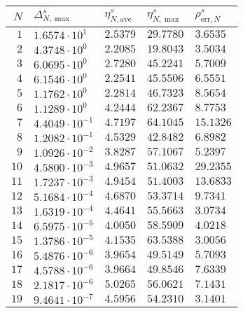 \begin{table}[h!]
    \begin{center}
        \small
        \begin{tabular}{r|llll}
        $N$ & $\Delta^s_{N,\max}$ & $\eta^s_{N,\text{ave}}$ & $\eta^s_{N,\max}$ & $\rho^s_{\text{err}, N}$ \\
        \hline
            $1$ & $1.6574 \cdot 10^{1}$ & $2.5379$ & $29.7780$ & $3.6535$ \\
            $2$ & $4.3748 \cdot 10^{0}$ & $2.2085$ & $19.8043$ & $3.5034$ \\
            $3$ & $6.0695 \cdot 10^{0}$ & $2.7280$ & $45.2241$ & $5.7009$ \\
            $4$ & $6.1546 \cdot 10^{0}$ & $2.2541$ & $45.5506$ & $6.5551$ \\
            $5$ & $1.1762 \cdot 10^{0}$ & $2.2814$ & $46.7323$ & $8.5654$ \\
            $6$ & $1.1289 \cdot 10^{0}$ & $4.2444$ & $62.2367$ & $8.7753$ \\
            $7$ & $4.4049 \cdot 10^{-1}$ & $4.7197$ & $64.1045$ & $15.1326$ \\
            $8$ & $1.2082 \cdot 10^{-1}$ & $4.5329$ & $42.8482$ & $6.8982$ \\
            $9$ & $1.0926 \cdot 10^{-2}$ & $3.8287$ & $57.1067$ & $5.2397$ \\
            $10$ & $4.5800 \cdot 10^{-3}$ & $4.9657$ & $51.0632$ & $29.2355$ \\
            $11$ & $1.7237 \cdot 10^{-3}$ & $4.9454$ & $51.4003$ & $13.6833$ \\
            $12$ & $5.1684 \cdot 10^{-4}$ & $4.6870$ & $53.3714$ & $9.7341$ \\
            $13$ & $1.6319 \cdot 10^{-4}$ & $4.4641$ & $55.5663$ & $3.0734$ \\
            $14$ & $6.5975 \cdot 10^{-5}$ & $4.0050$ & $58.5909$ & $4.0218$ \\
            $15$ & $1.3786 \cdot 10^{-5}$ & $4.1535$ & $63.5388$ & $3.0056$ \\
            $16$ & $5.4876 \cdot 10^{-6}$ & $3.9654$ & $49.5149$ & $5.7093$ \\
            $17$ & $4.5788 \cdot 10^{-6}$ & $3.9664$ & $49.8546$ & $7.6339$ \\
            $18$ & $2.1817 \cdot 10^{-6}$ & $5.0265$ & $56.0621$ & $7.1431$ \\
            $19$ & $9.4641 \cdot 10^{-7}$ & $4.5956$ & $54.2310$ & $3.1401$ \\

\end{tabular}
\end{center}
\end{table}
